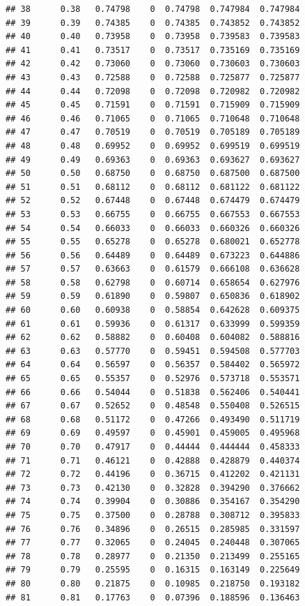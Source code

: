 \documentclass{article}\usepackage[]{graphicx}\usepackage[]{color}
\makeatletter
\newenvironment{kframe}{%
 \def\at@end@of@kframe{}%
 \ifinner\ifhmode%
  \def\at@end@of@kframe{\end{minipage}}%
  \begin{minipage}{\columnwidth}%
 \fi\fi%
 \def\FrameCommand##1{\hskip\@totalleftmargin \hskip-\fboxsep
 \colorbox{shadecolor}{##1}\hskip-\fboxsep
     \hskip-\linewidth \hskip-\@totalleftmargin \hskip\columnwidth}%
 \MakeFramed {\advance\hsize-\width
   \@totalleftmargin\z@ \linewidth\hsize
   \@setminipage}}%
 {\par\unskip\endMakeFramed%
 \at@end@of@kframe}
\newenvironment{knitrout}{}{} %
\makeatother
\begin{document}
\begin{knitrout}
\begin{kframe}
\begin{verbatim}
## 38      0.38   0.74798    0  0.74798  0.747984  0.747984
## 39      0.39   0.74385    0  0.74385  0.743852  0.743852
## 40      0.40   0.73958    0  0.73958  0.739583  0.739583
## 41      0.41   0.73517    0  0.73517  0.735169  0.735169
## 42      0.42   0.73060    0  0.73060  0.730603  0.730603
## 43      0.43   0.72588    0  0.72588  0.725877  0.725877
## 44      0.44   0.72098    0  0.72098  0.720982  0.720982
## 45      0.45   0.71591    0  0.71591  0.715909  0.715909
## 46      0.46   0.71065    0  0.71065  0.710648  0.710648
## 47      0.47   0.70519    0  0.70519  0.705189  0.705189
## 48      0.48   0.69952    0  0.69952  0.699519  0.699519
## 49      0.49   0.69363    0  0.69363  0.693627  0.693627
## 50      0.50   0.68750    0  0.68750  0.687500  0.687500
## 51      0.51   0.68112    0  0.68112  0.681122  0.681122
## 52      0.52   0.67448    0  0.67448  0.674479  0.674479
## 53      0.53   0.66755    0  0.66755  0.667553  0.667553
## 54      0.54   0.66033    0  0.66033  0.660326  0.660326
## 55      0.55   0.65278    0  0.65278  0.680021  0.652778
## 56      0.56   0.64489    0  0.64489  0.673223  0.644886
## 57      0.57   0.63663    0  0.61579  0.666108  0.636628
## 58      0.58   0.62798    0  0.60714  0.658654  0.627976
## 59      0.59   0.61890    0  0.59807  0.650836  0.618902
## 60      0.60   0.60938    0  0.58854  0.642628  0.609375
## 61      0.61   0.59936    0  0.61317  0.633999  0.599359
## 62      0.62   0.58882    0  0.60408  0.604082  0.588816
## 63      0.63   0.57770    0  0.59451  0.594508  0.577703
## 64      0.64   0.56597    0  0.56357  0.584402  0.565972
## 65      0.65   0.55357    0  0.52976  0.573718  0.553571
## 66      0.66   0.54044    0  0.51838  0.562406  0.540441
## 67      0.67   0.52652    0  0.48548  0.550408  0.526515
## 68      0.68   0.51172    0  0.47266  0.493490  0.511719
## 69      0.69   0.49597    0  0.45901  0.459005  0.495968
## 70      0.70   0.47917    0  0.44444  0.444444  0.458333
## 71      0.71   0.46121    0  0.42888  0.428879  0.440374
## 72      0.72   0.44196    0  0.36715  0.412202  0.421131
## 73      0.73   0.42130    0  0.32828  0.394290  0.376662
## 74      0.74   0.39904    0  0.30886  0.354167  0.354290
## 75      0.75   0.37500    0  0.28788  0.308712  0.395833
## 76      0.76   0.34896    0  0.26515  0.285985  0.331597
## 77      0.77   0.32065    0  0.24045  0.240448  0.307065
## 78      0.78   0.28977    0  0.21350  0.213499  0.255165
## 79      0.79   0.25595    0  0.16315  0.163149  0.225649
## 80      0.80   0.21875    0  0.10985  0.218750  0.193182
## 81      0.81   0.17763    0  0.07396  0.188596  0.136463

\end{verbatim}
\end{kframe}
\end{knitrout}
\end{document}
